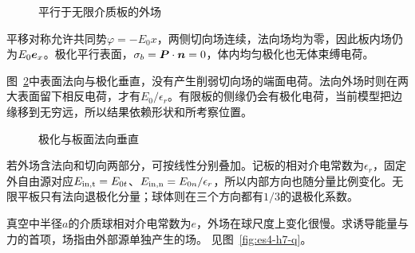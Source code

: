 \begin{figure}[H]\centering
{}
\caption{平行于无限介质板的外场}\label{fig:es4-h6-q}
\end{figure}
\begin{solution}
平移对称允许共同势$\varphi=-E_0x$，两侧切向场连续，法向场均为零，因此板内场仍为$E_0\bm{e}_x$。极化平行表面，$\sigma_b=\bm{P}\cdot\bm{n}=0$，体内均匀极化也无体束缚电荷。

图~\ref{fig:es4-h6-s}中表面法向与极化垂直，没有产生削弱切向场的端面电荷。法向外场时则在两大表面留下相反电荷，才有$E_0/\epsilon_r$。有限板的侧缘仍会有极化电荷，当前模型把边缘移到无穷远，所以结果依赖形状和所考察位置。
\begin{figure}[H]\centering
{}
\caption{极化与板面法向垂直}\label{fig:es4-h6-s}
\end{figure}


若外场含法向和切向两部分，可按线性分别叠加。记板的相对介电常数为$\epsilon_r$，固定外自由源对应$E_{\rm in,t}=E_{0t}$、$E_{\rm in,n}=E_{0n}/\epsilon_r$，所以内部方向也随分量比例变化。无限平板只有法向退极化分量；球体则在三个方向都有$1/3$的退极化系数。
\end{solution}

\begin{exercise}[小介质球在缓变场中的力]\label{ex:es4-h7}
真空中半径$a$的介质球相对介电常数为$e$，外场在球尺度上变化很慢。求诱导能量与力的首项，场指由外部源单独产生的场。 见图~\ref{fig:es4-h7-q}。
\end{exercise}

